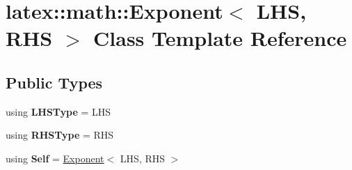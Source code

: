 \hypertarget{classlatex_1_1math_1_1Exponent}{\section{latex\-:\-:math\-:\-:Exponent$<$ L\-H\-S, R\-H\-S $>$ Class Template Reference}
\label{classlatex_1_1math_1_1Exponent}
}
\subsection*{Public Types}
\begin{DoxyCompactItemize}
\item 
\hypertarget{classlatex_1_1math_1_1Exponent_ab3eab1448aad07c78b264be2991c5d79}{using {\bfseries L\-H\-S\-Type} = L\-H\-S}\label{classlatex_1_1math_1_1Exponent_ab3eab1448aad07c78b264be2991c5d79}

\item 
\hypertarget{classlatex_1_1math_1_1Exponent_adf3693cd0636a4ddf6e323d498eb4ae5}{using {\bfseries R\-H\-S\-Type} = R\-H\-S}\label{classlatex_1_1math_1_1Exponent_adf3693cd0636a4ddf6e323d498eb4ae5}

\item 
\hypertarget{classlatex_1_1math_1_1Exponent_acf1939d7c89c1030694ca61e09feb8b3}{using {\bfseries Self} = \hyperlink{classlatex_1_1math_1_1Exponent}{Exponent}$<$ L\-H\-S, R\-H\-S $>$}\label{classlatex_1_1math_1_1Exponent_acf1939d7c89c1030694ca61e09feb8b3}

\end{DoxyCompactItemize}
